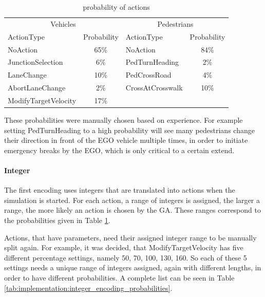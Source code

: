 \begin{table}[ht]
	\centering
	\begin{tabular}{lc|lc}
		\hline
		\multicolumn{2}{c|}{Vehicles} & \multicolumn{2}{c}{Pedestrians} \\
		ActionType & Probability & ActionType & Probability \\
		\hline
		NoAction & 65\% & NoAction & 84\% \\
		JunctionSelection & 6\% & PedTurnHeading & 2\% \\
		LaneChange & 10\% & PedCrossRoad & 4\% \\
		AbortLaneChange & 2\% & CrossAtCrosswalk & 10\% \\
		ModifyTargetVelocity & 17\% & & \\
		\hline
	\end{tabular}
	\caption{probability of actions}
	\label{tab:implementation:action_probabilities}
\end{table}

These probabilities were manually chosen based on experience. For example setting PedTurnHeading to a high probability will see many pedestrians change their direction in front of the EGO vehicle multiple times, in order to initiate emergency breaks by the EGO, which is only critical to a certain extend.

\paragraph{Integer}
The first encoding uses integers that are translated into actions when the simulation is started. For each action, a range of integers is assigned, the larger a range, the more likely an action is chosen by the GA. These ranges correspond to the probabilities given in Table \ref{tab:implementation:action_probabilities}.

Actions, that have parameters, need their assigned integer range to be manually split again. For example, it was decided, that ModifyTargetVelocity has five different percentage settings, namely 50, 70, 100, 130, 160. So each of these 5 settings needs a unique range of integers assigned, again with different lengths, in order to have different probabilities. A complete list can be seen in Table \ref{tab:implementation:integer_encoding_probabilities}.

